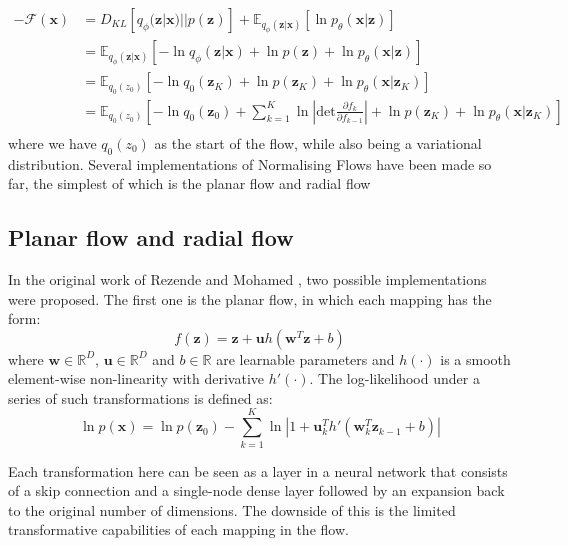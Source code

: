 \documentclass{report}
\newcommand{\E}{\mathbb{E}}
\newcommand{\bu}{\mathbf{u}}
\newcommand{\bw}{\mathbf{w}}
\newcommand{\bx}{\mathbf{x}}
\newcommand{\bz}{\mathbf{z}}
\newcommand{\parfrac}[2]{\frac{\partial #1}{\partial#2}}
\begin{document}
\begin{equation}\label{equation:negative_free_energy_with_flow}
    \begin{split}
    -\mathcal{F}(\bx) &= D_{KL}[q_\phi(\bz|\bx) || p(\bz)] + \E_{q_\phi(\bz|\bx)}[\ln p_\theta(\bx|\bz)]\\
    &= \E_{q_\phi(\bz|\bx)}[-\ln q_\phi(\bz|\bx) + \ln p(\bz) + \ln p_\theta(\bx|\bz)]\\
    &= \E_{q_0(z_0)}[-\ln q_0(\bz_K) + \ln p(\bz_K) + \ln p_\theta(\bx|\bz_K)]\\
    &= \E_{q_0(z_0)}[-\ln q_0(\bz_0) + \sum\limits^K_{k=1}\ln \left|\text{det} \parfrac{f_k}{f_{k-1}} \right| + \ln p(\bz_K) + \ln p_\theta(\bx|\bz_K)]\\
    \end{split}
\end{equation}
where we have $q_0(z_0)$ as the start of the flow, while also being a variational distribution. Several implementations of Normalising Flows have been made so far, the simplest of which is the planar flow and radial flow

\subsection{Planar flow and radial flow}\label{section:planar_radial_flow}
In the original work of Rezende and Mohamed \cite{rezende2016variational}, two possible implementations were proposed. The first one is the planar flow, in which each mapping has the form:
\begin{equation}\label{equation:planar_flow}
    f(\bz) = \bz + \bu h(\bw^T\bz + b)
\end{equation}
where $\bw \in \mathbb{R}^D$, $\bu \in \mathbb{R}^D$ and $b \in \mathbb{R}$ are learnable parameters and $h(\cdot)$ is a smooth element-wise non-linearity with derivative $h'(\cdot)$. The log-likelihood under a series of such transformations is defined as:
\begin{equation}\label{equation:planar_flow_logdet}
    \ln p(\bx) = \ln p(\bz_0) - \sum\limits^K_{k=1} \ln \left|1 + \bu_k^T h'(\bw_k^T \bz_{k-1} + b) \right|
\end{equation}

Each transformation here can be seen as a layer in a neural network that consists of a skip connection and a single-node dense layer followed by an expansion back to the original number of dimensions. The downside of this is the limited transformative capabilities of each mapping in the flow.
\end{document}
